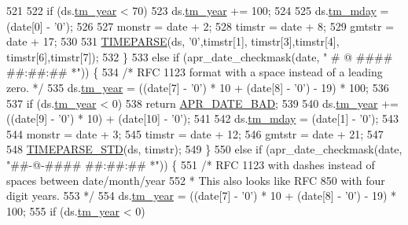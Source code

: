 \begin{DoxyCode}
521 
522         \textcolor{keywordflow}{if} (ds.\hyperlink{structapr__time__exp__t_a35c32245be49279a6689e34bcd6e534a}{tm\_year} < 70)
523             ds.\hyperlink{structapr__time__exp__t_a35c32245be49279a6689e34bcd6e534a}{tm\_year} += 100;
524 
525         ds.\hyperlink{structapr__time__exp__t_a6c09a274f011841e9e988c3c9504848a}{tm\_mday} = (date[0] - \textcolor{charliteral}{'0'});
526 
527         monstr = date + 2;
528         timstr = date + 8;
529         gmtstr = date + 17;
530 
531         \hyperlink{apr__date_8c_aa1f7825c136058e465186eb635d12f11}{TIMEPARSE}(ds, \textcolor{charliteral}{'0'},timstr[1], timstr[3],timstr[4], timstr[6],timstr[7]);
532     \}
533     \textcolor{keywordflow}{else} \textcolor{keywordflow}{if} (apr\_date\_checkmask(date, \textcolor{stringliteral}{" # @$$ #### ##:##:## *"})) \{   
534         \textcolor{comment}{/* RFC 1123 format with a space instead of a leading zero. */}
535         ds.\hyperlink{structapr__time__exp__t_a35c32245be49279a6689e34bcd6e534a}{tm\_year} = ((date[7] - \textcolor{charliteral}{'0'}) * 10 + (date[8] - \textcolor{charliteral}{'0'}) - 19) * 100;
536 
537         \textcolor{keywordflow}{if} (ds.\hyperlink{structapr__time__exp__t_a35c32245be49279a6689e34bcd6e534a}{tm\_year} < 0)
538             \textcolor{keywordflow}{return} \hyperlink{group__APR__Util__Date_ga8be88b25f4b477ad13c4067c959411b0}{APR\_DATE\_BAD};
539 
540         ds.\hyperlink{structapr__time__exp__t_a35c32245be49279a6689e34bcd6e534a}{tm\_year} += ((date[9] - \textcolor{charliteral}{'0'}) * 10) + (date[10] - \textcolor{charliteral}{'0'});
541 
542         ds.\hyperlink{structapr__time__exp__t_a6c09a274f011841e9e988c3c9504848a}{tm\_mday} = (date[1] - \textcolor{charliteral}{'0'});
543 
544         monstr = date + 3;
545         timstr = date + 12;
546         gmtstr = date + 21;
547 
548         \hyperlink{apr__date_8c_a574f7cc7ba24c017bff5d6c41cf5903d}{TIMEPARSE\_STD}(ds, timstr);
549     \}
550     \textcolor{keywordflow}{else} \textcolor{keywordflow}{if} (apr\_date\_checkmask(date, \textcolor{stringliteral}{"##-@$$-#### ##:##:## *"})) \{
551        \textcolor{comment}{/* RFC 1123 with dashes instead of spaces between date/month/year}
552 \textcolor{comment}{        * This also looks like RFC 850 with four digit years.}
553 \textcolor{comment}{        */}
554         ds.\hyperlink{structapr__time__exp__t_a35c32245be49279a6689e34bcd6e534a}{tm\_year} = ((date[7] - \textcolor{charliteral}{'0'}) * 10 + (date[8] - \textcolor{charliteral}{'0'}) - 19) * 100;
555         \textcolor{keywordflow}{if} (ds.\hyperlink{structapr__time__exp__t_a35c32245be49279a6689e34bcd6e534a}{tm\_year} < 0)

\end{DoxyCode}
